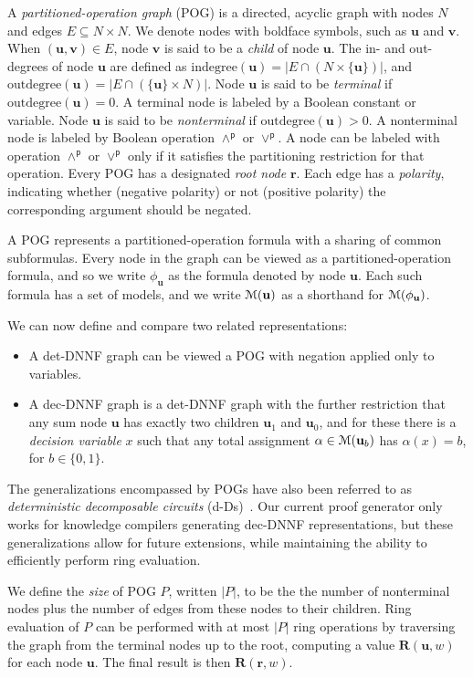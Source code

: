 \documentclass[letterpaper,USenglish,cleveref, autoref, thm-restate]{lipics-v2021}
\newcommand{\pand}{\mathbin{\land^\textsf{p}}}
\newcommand{\por}{\mathbin{\lor^\textsf{p}}}
\newcommand{\rep}{\textbf{R}}
\newcommand{\assign}{\alpha}
\newcommand{\modelset}{{\cal M}}
\newcommand{\indegree}{\textrm{indegree}}
\newcommand{\outdegree}{\textrm{outdegree}}
\newcommand{\makenode}[1]{\mathbf{#1}}
\newcommand{\nodeu}{\makenode{u}}
\newcommand{\nodev}{\makenode{v}}
\newcommand{\noder}{\makenode{r}}
\begin{document}
A \emph{partitioned-operation graph} (POG) is a directed, acyclic
graph with nodes $N$ and edges $E \subseteq N \times N$.  We denote
nodes with boldface symbols, such as $\nodeu$ and $\nodev$.  When
$(\nodeu,\nodev) \in E$, node $\nodev$ is said to be a \emph{child} of
node $\nodeu$.  The in- and out-degrees of node $\nodeu$ are defined
as $\indegree(\nodeu) = | E \cap (N \times \{\nodeu\}) |$, and
$\outdegree(\nodeu) = | E \cap (\{\nodeu\} \times N) |$.  Node
$\nodeu$ is said to be \emph{terminal} if $\outdegree(\nodeu) = 0$.  A
terminal node is labeled by a Boolean constant or variable.  Node
$\nodeu$ is said to be \emph{nonterminal} if $\outdegree(\nodeu) > 0$.
A nonterminal node is labeled by Boolean operation $\pand$ or $\por$.
A node can be labeled with operation $\pand$ or $\por$ only if it
satisfies the partitioning restriction for that operation.  Every POG
has a designated \emph{root node} $\noder$.  Each edge has
a \emph{polarity}, indicating whether (negative polarity) or not
(positive polarity) the corresponding argument should be negated.

A POG represents a partitioned-operation
formula with a sharing of common subformulas.  Every node in the graph can be viewed as a partitioned-operation formula, and so we write
$\phi_{\nodeu}$ as the formula denoted by node $\nodeu$.
Each such formula has a set of models, and we write $\modelset(\nodeu)$ as a shorthand for $\modelset(\phi_{\nodeu})$.

We can now define and compare two related representations:
\begin{itemize}
\item A det-DNNF graph can be viewed a POG with negation applied only to variables.
\item A dec-DNNF graph is a det-DNNF graph with the further restriction that any
  sum node $\nodeu$ has exactly two children $\nodeu_1$ and $\nodeu_0$, and for these there is a \emph{decision variable} $x$ such that
  any total assignment $\assign \in  \modelset(\nodeu_b)$ has $\assign(x)=b$, for $b \in \{0,1\}$.
\end{itemize}
The generalizations encompassed by POGs have also been referred to as \emph{deterministic decomposable circuits} (d-Ds)~\cite{monet:amw:2018}.
Our current proof generator only works for knowledge compilers
generating dec-DNNF representations, but these generalizations
allow for future extensions, while maintaining the ability to
efficiently perform ring evaluation.


We define the \emph{size} of POG $P$, written $|P|$, to be the
the number of nonterminal nodes plus the number of edges from these nodes to their children.  Ring
evaluation of $P$ can be performed with at most $|P|$ ring
operations by traversing the graph from the terminal nodes up to
the root, computing a value $\rep(\nodeu, w)$ for each node $\nodeu$.
The final result is then $\rep(\noder, w)$.
\end{document}
